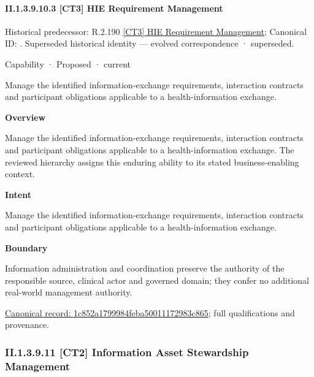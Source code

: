 \paragraph*{II.1.3.9.10.3 [CT3] HIE Requirement Management}
\label{navigation:II.1.3.9.10.3}

{\small Historical predecessor: R.2.190 \hyperref[element:a32c8bff0c284f5c9d6ab1f46991c232]{[CT3] HIE Requirement Management}; Canonical ID: \texttt{}. Superseded historical identity — evolved correspondence · superseded.}\par
\label{element:1c852a1799984feba50011172983c865}
{\small Capability · Proposed · current}\par

Manage the identified information-exchange requirements, interaction contracts and participant obligations applicable to a health-information exchange.



\textbf{Overview}



Manage the identified information-exchange requirements, interaction contracts and participant obligations applicable to a health-information exchange. The reviewed hierarchy assigns this enduring ability to its stated business-enabling context.



\textbf{Intent}



Manage the identified information-exchange requirements, interaction contracts and participant obligations applicable to a health-information exchange.



\textbf{Boundary}



Information administration and coordination preserve the authority of the responsible source, clinical actor and governed domain; they confer no additional real-world management authority.


{\footnotesize \href{../../../../../../../continuum/strategy/capability/1c852a1799984feba50011172983c865.md}{Canonical record: 1c852a1799984feba50011172983c865}; full qualifications and provenance.}\par
\subsubsection*{II.1.3.9.11 [CT2] Information Asset Stewardship Management}
\label{navigation:II.1.3.9.11}

